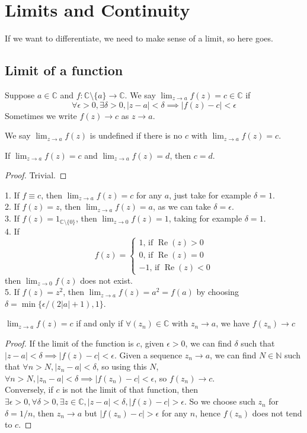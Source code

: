 \section{Limits and Continuity}
If we want to differentiate, we need to make sense of a limit, so here goes.
\subsection{Limit of a function}
\begin{definition}
    Suppose $a\in\mathbb C$ and $f:\mathbb C\setminus\{a\}\to\mathbb C$.
    We say $\lim_{z\to a}f(z)=c\in\mathbb C$ if
    $$\forall\epsilon>0,\exists\delta>0,|z-a|<\delta\implies |f(z)-c|<\epsilon$$
    Sometimes we write $f(z)\to c$ as $z\to a$.
\end{definition}
We say $\lim_{z\to a}f(z)$ is undefined if there is no $c$ with $\lim_{z\to a}f(z)=c$.
\begin{proposition}
    If $\lim_{z\to a}f(z)=c$ and $\lim_{z\to a}f(z)=d$, then $c=d$.
\end{proposition}
\begin{proof}
    Trivial.
\end{proof}
\begin{example}
    1. If $f\equiv c$, then $\lim_{z\to a}f(z)=c$ for any $a$, just take for example $\delta=1$.\\
    2. If $f(z)=z$, then $\lim_{z\to a}f(z)=a$, as we can take $\delta=\epsilon$.\\
    3. If $f(z)=1_{\mathbb C\setminus\{0\}}$, then $\lim_{z\to 0}f(z)=1$, taking for example $\delta=1$.\\
    4. If
    $$f(z)=\begin{cases}
        1\text{, if $\operatorname{Re}(z)>0$}\\
        0\text{, if $\operatorname{Re}(z)=0$}\\
        -1\text{, if $\operatorname{Re}(z)<0$}
    \end{cases}$$
    then $\lim_{z\to 0}f(z)$ does not exist.\\
    5. If $f(z)=z^2$, then $\lim_{z\to a}f(z)=a^2=f(a)$ by choosing $\delta=\min\{\epsilon/(2|a|+1),1\}$.
\end{example}
\begin{proposition}
    $\lim_{z\to a}f(z)=c$ if and only if $\forall (z_n)\in\mathbb C$ with $z_n\to a$, we have $f(z_n)\to c$
\end{proposition}
\begin{proof}
    If the limit of the function is $c$, given $\epsilon>0$, we can find $\delta$ such that $|z-a|<\delta\implies |f(z)-c|<\epsilon$.
    Given a sequence $z_n\to a$, we can find $N\in\mathbb N$ such that $\forall n>N,|z_n-a|<\delta$, so using this $N$, $\forall n>N,|z_n-a|<\delta\implies |f(z_n)-c|<\epsilon$, so $f(z_n)\to c$.\\
    Conversely, if $c$ is not the limit of that function, then $\exists\epsilon>0,\forall\delta>0,\exists z\in\mathbb C,|z-a|<\delta,|f(z)-c|>\epsilon$.
    So we choose such $z_n$ for $\delta=1/n$, then $z_n\to a$ but $|f(z_n)-c|>\epsilon$ for any $n$, hence $f(z_n)$ does not tend to $c$.
\end{proof}
